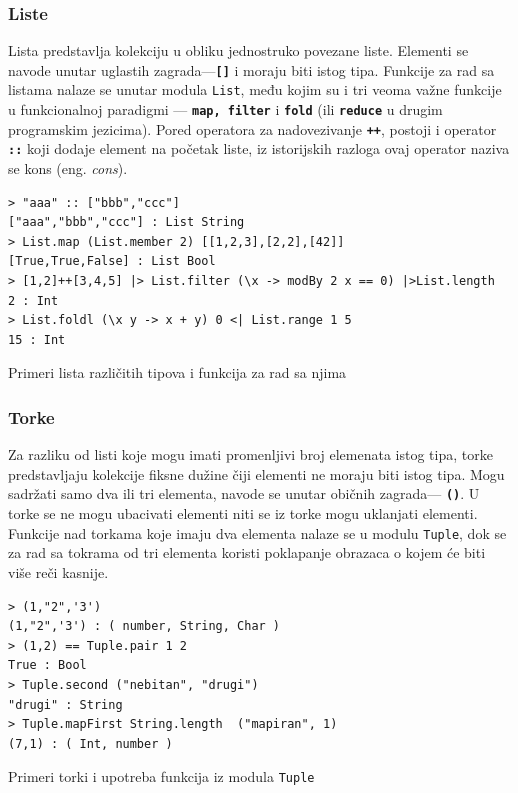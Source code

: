 \documentclass[12pt,oneside]{memoir}
\begin{document}
\subsubsection{Liste}
Lista predstavlja kolekciju u obliku jednostruko povezane liste. Elementi se navode
unutar uglastih zagrada---\textbf{\texttt{[\smallskip ]}} i moraju biti istog tipa. Funkcije za rad
sa listama nalaze se unutar modula \texttt{List}, među kojim su i tri veoma važne funkcije 
u funkcionalnoj paradigmi --- \textbf{\texttt{map, filter}} i \textbf{\texttt{fold}} (ili
\textbf{\texttt{reduce}} u drugim programskim jezicima).
Pored operatora za nadovezivanje \textbf{\texttt{++}}, postoji i operator \textbf{\texttt{::}} koji
dodaje element na početak liste, iz istorijskih razloga ovaj operator naziva se kons
(eng. \emph{cons}). 
\begin{listing}[h]
\begin{verbatim}
> "aaa" :: ["bbb","ccc"]
["aaa","bbb","ccc"] : List String
> List.map (List.member 2) [[1,2,3],[2,2],[42]]
[True,True,False] : List Bool
> [1,2]++[3,4,5] |> List.filter (\x -> modBy 2 x == 0) |>List.length
2 : Int
> List.foldl (\x y -> x + y) 0 <| List.range 1 5 
15 : Int
\end{verbatim}
\caption{Primeri lista različitih tipova i funkcija za rad sa njima}
\label{listing:liste}
\end{listing}
\subsubsection{Torke}
Za razliku od listi koje mogu imati promenljivi broj elemenata istog tipa, torke
predstavljaju kolekcije fiksne dužine čiji elementi ne moraju biti istog tipa.
Mogu sadržati samo dva ili tri elementa, navode se unutar običnih zagrada---
\textbf{\texttt{()}}. U torke se ne mogu ubacivati elementi niti se iz torke mogu
uklanjati elementi. Funkcije nad torkama koje imaju dva elementa nalaze se u modulu
\texttt{Tuple}, dok se za rad sa tokrama od tri elementa koristi poklapanje obrazaca
o kojem će biti više reči kasnije.
\begin{listing}[h]
\begin{verbatim}
> (1,"2",'3')
(1,"2",'3') : ( number, String, Char )
> (1,2) == Tuple.pair 1 2
True : Bool
> Tuple.second ("nebitan", "drugi")
"drugi" : String
> Tuple.mapFirst String.length  ("mapiran", 1)
(7,1) : ( Int, number )
\end{verbatim}
\caption{Primeri torki i upotreba funkcija iz modula \texttt{Tuple}}
\label{listing:torke}
\end{listing}
\end{document}
